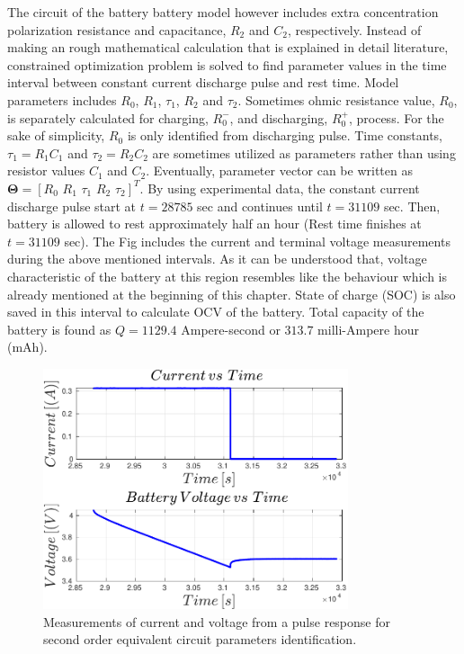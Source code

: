 \documentclass[12pt]{article}
\begin{document}
\par \noindent The circuit of the battery battery model however includes extra concentration polarization resistance and capacitance, $R_{2}$ and $C_{2}$, respectively. Instead of making an rough mathematical calculation that is explained in detail literature, constrained optimization problem is solved to find parameter values in the time interval between constant current discharge pulse and rest time. Model parameters includes $R_{0}$, $R_{1}$, $\tau_{1}$, $R_{2}$ and $\tau_{2}$. Sometimes ohmic resistance value, $R_{0}$, is separately calculated for charging, $R_{0}^{-}$, and discharging, $R_{0}^{+}$, process. For the sake of simplicity, $R_{0}$ is only identified from discharging pulse. Time constants, $\tau_{1}=R_{1}C_{1}$ and $\tau_{2}=R_{2}C_{2}$ are sometimes utilized as parameters rather than using resistor values $C_{1}$ and $C_{2}$. Eventually, parameter vector can be written as $\bm{\Theta} = [R_{0}\,\,R_{1}\,\,\tau_{1}\,\,R_{2}\,\,\tau_{2}]^{T}$. By using experimental data, the constant current discharge pulse start at $t=28785$ sec and continues until $t=31109$ sec. Then, battery is allowed to rest approximately half an hour (Rest time finishes at $t = 31109$ sec). The Fig includes the current and terminal voltage measurements during the above mentioned intervals. As it can be understood that, voltage characteristic of the battery at this region resembles like the behaviour which is already mentioned at the beginning of this chapter. State of charge (SOC) is also saved in this interval to calculate OCV of the battery. Total capacity of the battery is found as $Q=1129.4$ Ampere-second or $313.7$ milli-Ampere hour (mAh). \newline

\begin{figure}[t!]
	\centering
	\includegraphics[width=0.8\textwidth, keepaspectratio]{images/Parameter_Identification_Region.pdf}
	\caption{Measurements of current and voltage
from a pulse response for second order equivalent circuit parameters identification.}
	\label{fig:Response_to_discharge_pulse_experimental}
\end{figure}
\end{document}
